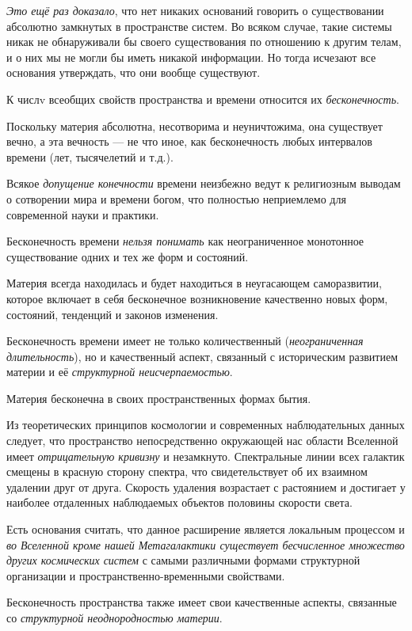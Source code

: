 \documentclass[a4paper,14pt,russian]{extreport}
\begin{document}
\emph{Это ещё раз доказало}, что нет никаких оснований говорить о существовании абсолютно замкнутых в пространстве систем. Во всяком случае, такие системы никак не обнаруживали бы своего существования по отношению к другим телам, и о них мы не могли бы иметь никакой информации. Но тогда исчезают все основания утверждать, что они вообще существуют.

К числv всеобщих свойств пространства и времени относится их \emph{бесконечность}.

Поскольку материя абсолютна, несотворима и неуничтожима, она существует вечно, а эта вечность --- не что иное, как бесконечность любых интервалов времени (лет, тысячелетий и т.д.).

Всякое \emph{допущение конечности} времени неизбежно ведут к религиозным выводам о сотворении мира и времени богом, что полностью неприемлемо для современной науки и практики.

Бесконечность времени \emph{нельзя понимать} как неограниченное монотонное существование одних и тех же форм и состояний.

Материя всегда находилась и будет находиться в неугасающем саморазвитии, которое включает в себя бесконечное возникновение качественно новых форм, состояний, тенденций и законов изменения.

Бесконечность времени имеет не только количественный (\emph{неограниченная длительность}), но и качественный аспект, связанный с историческим развитием материи и её \emph{структурной неисчерпаемостью}.

Материя бесконечна в своих пространственных формах бытия.

Из теоретических принципов космологии и современных наблюдательных данных следует, что пространство непосредственно окружающей нас области Вселенной имеет \emph{отрицательную кривизну} и незамкнуто. Спектральные линии всех галактик смещены в красную сторону спектра, что свидетельствует об их взаимном удалении друг от друга. Скорость удаления возрастает с растоянием и достигает у наиболее отдаленных наблюдаемых объектов половины скорости света.

Есть основания считать, что данное расширение является локальным процессом и \emph{во Вселенной кроме нашей Метагалактики существует бесчисленное множество других космических систем} с самыми различными формами структурной организации и пространственно-временными свойствами.

Бесконечность пространства также имеет свои качественные аспекты, связанные со \emph{структурной неоднородностью материи}.
\end{document}
